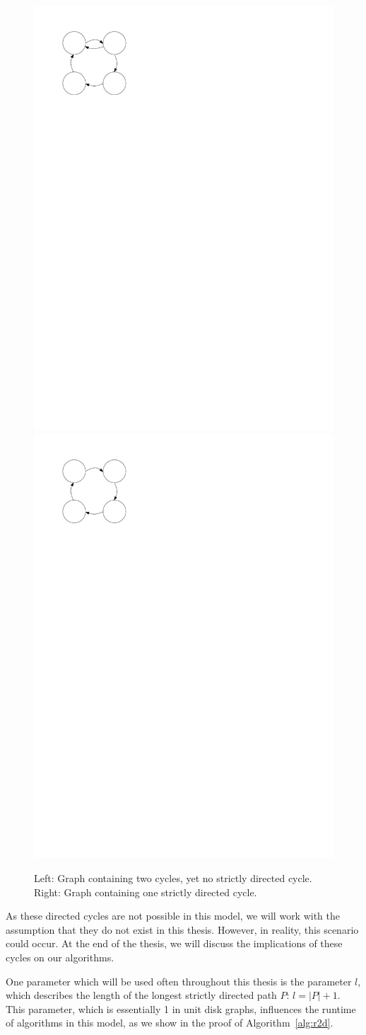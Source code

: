 \begin{figure}[ht]
\center
\includegraphics[width=0.2\linewidth]{figures/normalcycle.pdf}%
\hspace{2cm}
\includegraphics[width=0.2\linewidth]{figures/strictlydirectedcycle.pdf}%
\caption{Left: Graph containing two cycles, yet no strictly directed cycle. \\Right: Graph containing one strictly directed cycle.}%
\end{figure}

As these directed cycles are not possible in this model, we will work with the assumption that they do not exist in this thesis. However, in reality, this scenario could occur. At the end of the thesis, we will discuss the implications of these cycles on our algorithms.

One parameter which will be used often throughout this thesis is the parameter $l$, which describes the length of the longest strictly directed path $P$: $l = |P|+1$. This parameter, which is essentially 1 in unit disk graphs, influences the runtime of algorithms in this model, as we show in the proof of Algorithm~\ref{alg:r2d}.
